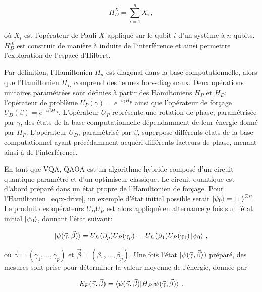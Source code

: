 \begin{equation}
    \label{eq:x-drive}
    H_{D}^{X} = \sum_{i=1}^{n} X_{i} \,,
\end{equation}

où $X_{i}$ est l'opérateur de Pauli $X$ appliqué sur le qubit $i$ d'un système à $n$ qubits. $H_{D}^{X}$ est construit de manière à induire de l'interférence et ainsi permettre l'exploration de l'espace d'Hilbert. 

Par définition, l'Hamiltonien $H_{p}$ est diagonal dans la base computationnelle, alors que l'Hamiltonien $H_{D}$ comprend des termes hors-diagonaux. Deux opérations unitaires paramétrées sont définies à partir des Hamiltoniens $H_{P}$ et $H_{D}$: l'opérateur de problème $U_{P}(\gamma) = e^{-i \gamma H_{P}}$ ainsi que l'opérateur de forçage $U_{D}(\beta) = e^{-i \beta H_{D}}$. L'opérateur $U_{P}$ représente une rotation de phase, paramétrisée par $\gamma$, des états de la base computationnelle dépendamment de leur énergie donné par $H_{P}$. L'opérateur $U_{D}$, paramétrisé par $\beta$, superpose différents états de la base computationnel ayant précédamment acquéri différents facteurs de phase, menant ainsi à de l'interférence.

En tant que VQA, QAOA est un algorithme hybride composé d'un circuit quantique paramétré et d'un optimiseur classique. Le circuit quantique est d'abord préparé dans un état propre de l'Hamiltonien de forçage. Pour l'Hamiltonien~\ref{eq:x-drive}, un exemple d'état initial possible serait $\ket{\psi_{0}} = \ket{+}^{\otimes n}$. Le produit des opérateurs $U_{D}U_{P}$ est alors appliqué en alternance $p$ fois sur l'état initial $\ket{\psi_{0}}$, donnant l'état suivant:

\begin{equation}
    \label{eq:final-state}
    \ket{\psi(\vec{\gamma}, \vec{\beta})} = U_D(\beta_p) U_P(\gamma_p) \cdots U_D(\beta_1) U_P(\gamma_1) \ket{\psi_{0}} \,,
\end{equation}

où $\vec{\gamma} = (\gamma_{1}, \dots, \gamma_{p})$ et $\vec{\beta} = (\beta_{1}, \dots, \beta_{p})$. Une fois l'état $\ket{\psi(\vec{\gamma}, \vec{\beta}})$ préparé, des mesures sont prise pour déterminer la valeur moyenne de l'énergie, donnée par

\begin{equation}
    E_{P} (\vec{\gamma}, \vec{\beta}) = \braket{ \psi(\vec{\gamma}, \vec{\beta}) | H_{P} | \psi(\vec{\gamma}, \vec{\beta}) } \,.
\end{equation}

